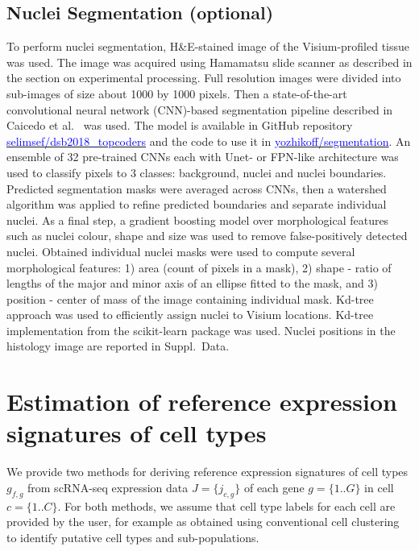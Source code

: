 \documentclass[11pt,a4paper]{article}
\newcommand{\blue}{\textcolor{blue}}
\begin{document}
\subsection{Nuclei Segmentation (optional)} \label{c2l_segmentation}

To perform nuclei segmentation, H\&E-stained image of the Visium-profiled tissue was used. The image was acquired using Hamamatsu slide scanner as described in the section on experimental processing. Full resolution images were divided into sub-images of size about 1000 by 1000 pixels. Then a state-of-the-art convolutional neural network (CNN)-based segmentation pipeline described in Caicedo et al.~\autocite{caicedo_nucleus_2019} was used. The model is available in GitHub repository\\ \href{https://github.com/selimsef/dsb2018_topcoders}{\blue{selimsef/dsb2018\_topcoders}} and the code to use it in \href{https://github.com/yozhikoff/segmentation}{\blue{yozhikoff/segmentation}}. An ensemble of 32 pre-trained CNNs each with Unet- or FPN-like architecture was used to classify pixels to 3 classes: background, nuclei and nuclei boundaries. Predicted segmentation masks were averaged across CNNs, then a watershed algorithm was applied to refine predicted boundaries and separate individual nuclei. As a final step, a gradient boosting model over morphological features such as nuclei colour, shape and size was used to remove false-positively detected nuclei.  
Obtained individual nuclei masks were used to compute several morphological features: 1) area (count of pixels in a mask), 2) shape - ratio of lengths of the major and minor axis of an ellipse fitted to the mask, and 3) position - center of mass of the image containing individual mask.
Kd-tree approach was used to efficiently assign nuclei to Visium locations. Kd-tree implementation from the scikit-learn package was used. Nuclei positions in the histology image are reported in Suppl.~Data.

\section{Estimation of reference expression signatures of cell types} \label{c2l_ref_prog}

We provide two methods for deriving reference expression signatures of cell types $g_{f,g}$ from scRNA-seq expression data $J=\{j_{c,g}\}$ of each gene $g=\{1..G\}$ in cell $c=\{1..C\}$. For both methods, we assume that cell type labels for each cell are provided by the user, for example as obtained using conventional cell clustering to identify putative cell types and sub-populations.
\end{document}
